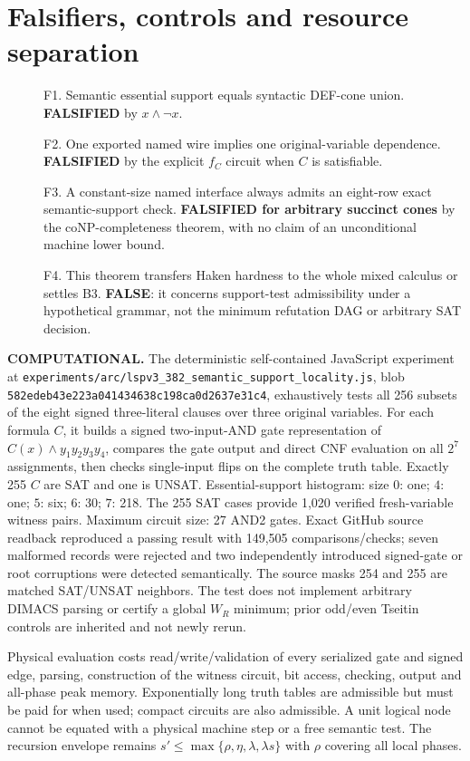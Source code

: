 \documentclass[11pt]{article}
\begin{document}
\section*{Falsifiers, controls and resource separation}
\begin{description}
\item[] F1. Semantic essential support equals syntactic DEF-cone union. \textbf{FALSIFIED} by $x\wedge\neg x$.
\item[] F2. One exported named wire implies one original-variable dependence. \textbf{FALSIFIED} by the explicit $f_C$ circuit when $C$ is satisfiable.
\item[] F3. A constant-size named interface always admits an eight-row exact semantic-support check. \textbf{FALSIFIED for arbitrary succinct cones} by the coNP-completeness theorem, with no claim of an unconditional machine lower bound.
\item[] F4. This theorem transfers Haken hardness to the whole mixed calculus or settles B3. \textbf{FALSE}: it concerns support-test admissibility under a hypothetical grammar, not the minimum refutation DAG or arbitrary SAT decision.
\end{description}

\noindent\textbf{COMPUTATIONAL.} The deterministic self-contained JavaScript experiment at
\texttt{experiments/arc/lspv3\_382\_semantic\_support\_locality.js}, blob \texttt{582edeb43e223a041434638c198ca0d2637e31c4}, exhaustively tests all 256 subsets of the eight signed three-literal clauses over three original variables. For each formula $C$, it builds a signed two-input-AND gate representation of $C(x)\wedge y_1y_2y_3y_4$, compares the gate output and direct CNF evaluation on all $2^7$ assignments, then checks single-input flips on the complete truth table. Exactly 255 $C$ are SAT and one is UNSAT. Essential-support histogram: size $0$: one; $4$: one; $5$: six; $6$: 30; $7$: 218. The 255 SAT cases provide 1,020 verified fresh-variable witness pairs. Maximum circuit size: 27 AND2 gates. Exact GitHub source readback reproduced a passing result with 149,505 comparisons/checks; seven malformed records were rejected and two independently introduced signed-gate or root corruptions were detected semantically. The source masks 254 and 255 are matched SAT/UNSAT neighbors. The test does not implement arbitrary DIMACS parsing or certify a global $W_R$ minimum; prior odd/even Tseitin controls are inherited and not newly rerun.

Physical evaluation costs read/write/validation of every serialized gate and signed edge, parsing, construction of the witness circuit, bit access, checking, output and all-phase peak memory. Exponentially long truth tables are admissible but must be paid for when used; compact circuits are also admissible. A unit logical node cannot be equated with a physical machine step or a free semantic test. The recursion envelope remains $s'\le\max\{\rho,\eta,\lambda,\lambda s\}$ with $\rho$ covering all local phases.
\end{document}
